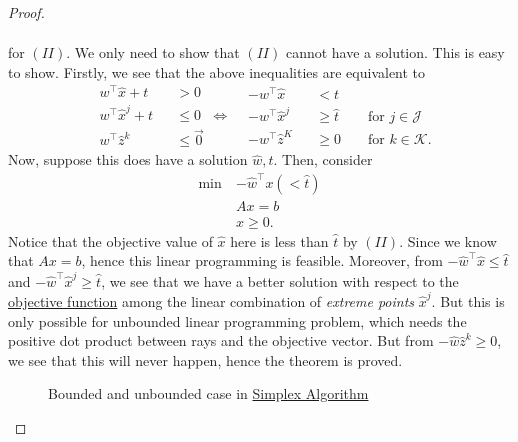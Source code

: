 \begin{proof}
\begin{enumerate}
\[\begin{split}
			      \end{split}
		      \]
		      for \((II)\). We only need to show that \((II)\) cannot have a solution. This is easy to show. Firstly,
		      we see that the above inequalities are equivalent to
		      \[
			      \begin{alignedat}{3}
				      &w^{\top}\hat{x}+t&&>0\\
				      &w^{\top}\hat{x}^j + t&&\leq 0\\
				      &w^{\top}\hat{z}^k &&\leq \vec{0}
			      \end{alignedat}\iff\begin{alignedat}{3}
				      &-w^{\top}\hat{x}&&<t\\
				      &-w^{\top}\hat{x}^j &&\geq \hat{t} &&\text{ for }j\in\mathcal{J}\\
				      &-w^{\top}\hat{z}^K &&\geq 0 &&\text{ for }k\in\mathcal{K}.
			      \end{alignedat}
		      \]
		      Now, suppose this does have a solution \(\hat{w}, \hat{t}\). Then, consider
		      \begin{align*}
			      \min~ & -\hat{w}^{\top}x(<\hat{t}) \\
			            & Ax = b                     \\
			            & x\geq 0.
		      \end{align*}
		      Notice that the objective value of \(\hat{x}\) here is less than \(\hat{t}\) by \((II)\). Since we know that
		      \(Ax = b\), hence this linear programming is feasible. Moreover, from \(-\hat{w}^{\top}\hat{x}\leq \hat{t}\) and
		      \(-\hat{w}^{\top}\hat{x}^j\geq \hat{t}\), we see that we have a better solution with respect to the \hyperref[def:objective-function]{objective function}
		      among the linear combination of \emph{extreme points} \(\hat{x}^j\). But this is only possible for unbounded linear
		      programming problem, which needs the positive dot product between rays and the objective vector. But from
		      \(-\hat{w}\hat{z}^k\geq 0\), we see that this will never happen, hence the theorem is proved.
		      \begin{figure}[H]
			      \centering
			      \caption{Bounded and unbounded case in \hyperref[algo:simplex-algorithm]{Simplex Algorithm}}
			      \label{fig:representation-theorem}
		      \end{figure}
	\end{enumerate}
\end{proof}

